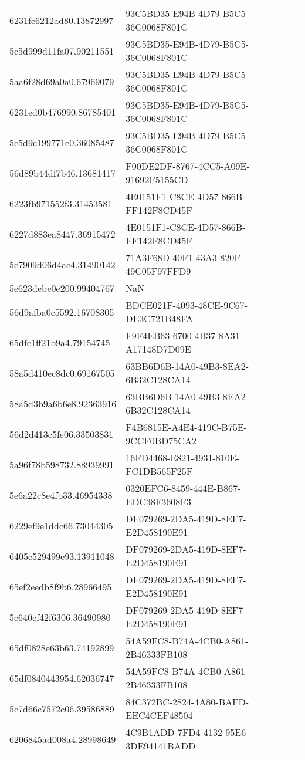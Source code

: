 \begin{tabular}{ll}
6231fe6212ad80.13872997 & 93C5BD35-E94B-4D79-B5C5-36C0068F801C \\
5c5d999d11fa07.90211551 & 93C5BD35-E94B-4D79-B5C5-36C0068F801C \\
5aa6f28d69a0a0.67969079 & 93C5BD35-E94B-4D79-B5C5-36C0068F801C \\
6231ed0b476990.86785401 & 93C5BD35-E94B-4D79-B5C5-36C0068F801C \\
5c5d9c199771e0.36085487 & 93C5BD35-E94B-4D79-B5C5-36C0068F801C \\
56d89b44df7b46.13681417 & F00DE2DF-8767-4CC5-A09E-91692F5155CD \\
6223fb971552f3.31453581 & 4E0151F1-C8CE-4D57-866B-FF142F8CD45F \\
6227d883ea8447.36915472 & 4E0151F1-C8CE-4D57-866B-FF142F8CD45F \\
5c7909d06d4ac4.31490142 & 71A3F68D-40F1-43A3-820F-49C05F97FFD9 \\
5e623debe0e200.99404767 & NaN \\
56d9afba0c5592.16708305 & BDCE021F-4093-48CE-9C67-DE3C721B48FA \\
65dfc1ff21b9a4.79154745 & F9F4EB63-6700-4B37-8A31-A17148D7D09E \\
58a5d410ec8dc0.69167505 & 63BB6D6B-14A0-49B3-8EA2-6B32C128CA14 \\
58a5d3b9a6b6e8.92363916 & 63BB6D6B-14A0-49B3-8EA2-6B32C128CA14 \\
56d2d413c5fe06.33503831 & F4B6815E-A4E4-419C-B75E-9CCF0BD75CA2 \\
5a96f78b598732.88939991 & 16FD4468-E821-4931-810E-FC1DB565F25F \\
5e6a22c8e4fb33.46954338 & 0320EFC6-8459-444E-B867-EDC38F3608F3 \\
6229ef9e1ddc66.73044305 & DF079269-2DA5-419D-8EF7-E2D458190E91 \\
6405c529499e93.13911048 & DF079269-2DA5-419D-8EF7-E2D458190E91 \\
65ef2eedb8f9b6.28966495 & DF079269-2DA5-419D-8EF7-E2D458190E91 \\
5c640cf42f6306.36490980 & DF079269-2DA5-419D-8EF7-E2D458190E91 \\
65df0828e63b63.74192899 & 54A59FC8-B74A-4CB0-A861-2B46333FB108 \\
65df0840443954.62036747 & 54A59FC8-B74A-4CB0-A861-2B46333FB108 \\
5c7d66c7572c06.39586889 & 84C372BC-2824-4A80-BAFD-EEC4CEF48504 \\
6206845ad008a4.28998649 & 4C9B1ADD-7FD4-4132-95E6-3DE94141BADD \\

\end{tabular}
